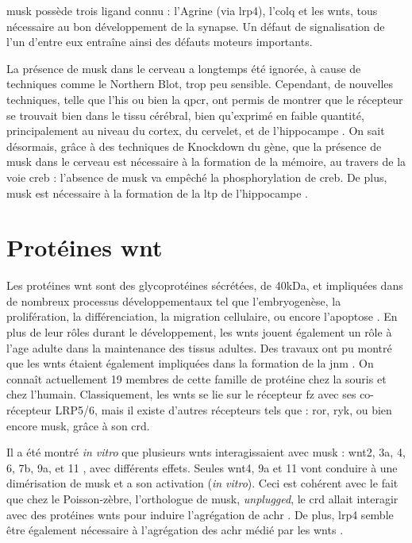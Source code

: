 	\gls{musk} possède trois ligand connu : l'Agrine (via \gls{lrp4}), l'\gls{colq} et les \Glspl{wnt}, tous nécessaire au bon développement de la synapse. Un défaut de signalisation de l'un d'entre eux entraîne ainsi des défauts moteurs importants.
	
	La présence de \gls{musk} dans le cerveau a longtemps été ignorée, à cause de techniques comme le Northern Blot, trop peu sensible. Cependant, de nouvelles techniques, telle que l'\gls{his} ou bien la \gls{qpcr}, ont permis de montrer que le récepteur se trouvait bien dans le tissu cérébral, bien qu'exprimé en faible quantité, principalement au niveau du cortex, du cervelet, et de l'hippocampe \cite{Garcia-Osta2006, Ksiazek2007}. On sait désormais, grâce à des techniques de Knockdown du gène, que la présence de \gls{musk} dans le cerveau est nécessaire à la formation de la mémoire, au travers de la voie \acrshort{creb} : l'absence de \gls{musk} va empêché la phosphorylation de \gls{creb}. De plus, \gls{musk} est nécessaire à la formation de la \gls{ltp} de l'hippocampe \cite{Garcia-Osta2006}.
	
\section{Protéines \gls{wnt}}
	\label{sec:IntroWnt}
	
	Les protéines \gls{wnt} sont des glycoprotéines sécrétées, de 40kDa, et impliquées dans de nombreux processus développementaux tel que l'embryogenèse, la prolifération, la différenciation, la migration cellulaire, ou encore l'apoptose \cite{Miller2002, Willert2012a}. En plus de leur rôles durant le développement, les \Glspl{wnt} jouent également un rôle à l'age adulte dans la maintenance des tissus adultes. Des travaux ont pu montré que les \Glspl{wnt} étaient également impliquées dans la formation de la \gls{jnm} \cite{Hall2000}. On connaît actuellement 19 membres de cette famille de protéine chez la souris et chez l'humain. Classiquement, les \Glspl{wnt} se lie sur le récepteur \gls{fz} avec ses co-récepteur LRP5/6, mais il existe d'autres récepteurs tels que : \acrshort{ror}, \acrshort{ryk}, ou bien encore \gls{musk}, grâce à son \gls{crd}.
	
	Il a été montré \emph{in vitro} que plusieurs \Glspl{wnt} interagissaient avec \gls{musk} : \Gls{wnt}2, 3a, 4, 6, 7b, 9a, et 11 \cite{Strochlic2012, Zhang2012, Barik2014}, avec différents effets. Seules \gls{wnt}4, 9a et 11 vont conduire à une dimérisation de \gls{musk} et a son activation (\emph{in vitro}). Ceci est cohérent avec le fait que chez le Poisson-zèbre, l'orthologue de \gls{musk}, \emph{unplugged}, le \gls{crd} allait interagir avec des protéines \Glspl{wnt} pour induire l'agrégation de \gls{achr} \cite{Jing2009, Gordon2012}. De plus, \gls{lrp4} semble être également nécessaire à l'agrégation des \gls{achr} médié par les \gls{wnt}s \cite{Zhang2012}.
	
